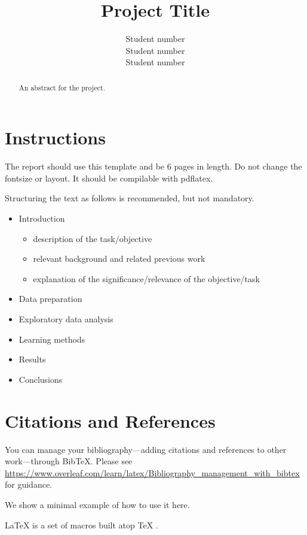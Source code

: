 \documentclass{article}
\title{Project Title}
\author{
  Student number\\
  \And
  Student number\\
 \And
  Student number\\
}
\begin{document}
\maketitle

\begin{abstract}
 An abstract for the project.
\end{abstract}

\section{Instructions}

The report should use this template and be 6 pages in length. Do not change the fontsize or layout. It should be compilable with pdflatex.

Structuring the text as follows is recommended, but not mandatory.

\begin{itemize}
\item Introduction
  \begin{itemize}
  \item description of the task/objective
  \item relevant background and related previous work
  \item explanation of the significance/relevance of the objective/task
  \end{itemize}
\item Data preparation
\item Exploratory data analysis
\item Learning methods
\item Results
\item Conclusions
\end{itemize}

\section*{Citations and References}
You can manage your bibliography---adding citations and references to other work---through BibTeX.
Please see \url{https://www.overleaf.com/learn/latex/Bibliography_management_with_bibtex} for guidance.

We show a minimal example of how to use it here.

\LaTeX{} \cite{latex2e} is a set of macros built atop \TeX{} \cite{texbook}.



\end{document}
